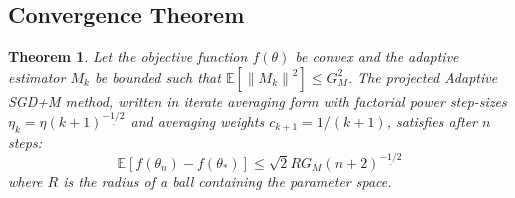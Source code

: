 \documentclass{article}
\newtheorem{theorem}{Theorem}
\newcommand{\E}{\mathbb{E}}
\newcommand{\norm}[1]{\left\lVert#1\right\rVert}
\begin{document}
\subsection{Convergence Theorem}

\begin{theorem}
Let the objective function \(f(\theta)\) be convex and the adaptive estimator \(M_k\) be bounded such that \(\E[\norm{M_k}^2] \le G_M^2\). The projected Adaptive SGD+M method, written in iterate averaging form with factorial power step-sizes \(\eta_k = \eta (k+1)^{\underline{-1/2}}\) and averaging weights \(c_{k+1} = 1/(k + 1)\), satisfies after \(n\) steps:
\[ \E[f(\theta_n) - f(\theta_*)] \le \sqrt{2}RG_M (n+2)^{\underline{-1/2}} \]
where \(R\) is the radius of a ball containing the parameter space.
\end{theorem}
\end{document}
